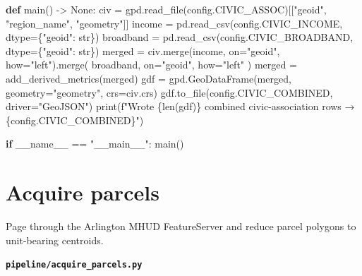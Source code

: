 \documentclass[
  letterpaper,
  DIV=11,
  numbers=noendperiod]{scrreprt}
\newenvironment{Shaded}{\begin{snugshade}}{\end{snugshade}}
\newcommand{\BuiltInTok}[1]{\textcolor[rgb]{0.00,0.23,0.31}{#1}}
\newcommand{\ControlFlowTok}[1]{\textcolor[rgb]{0.00,0.23,0.31}{\textbf{#1}}}
\newcommand{\KeywordTok}[1]{\textcolor[rgb]{0.00,0.23,0.31}{\textbf{#1}}}
\newcommand{\NormalTok}[1]{\textcolor[rgb]{0.00,0.23,0.31}{#1}}
\newcommand{\OperatorTok}[1]{\textcolor[rgb]{0.37,0.37,0.37}{#1}}
\newcommand{\SpecialCharTok}[1]{\textcolor[rgb]{0.37,0.37,0.37}{#1}}
\newcommand{\SpecialStringTok}[1]{\textcolor[rgb]{0.13,0.47,0.30}{#1}}
\newcommand{\StringTok}[1]{\textcolor[rgb]{0.13,0.47,0.30}{#1}}
\newcommand{\VariableTok}[1]{\textcolor[rgb]{0.07,0.07,0.07}{#1}}
\begin{document}
\begin{Shaded}
\begin{Highlighting}[]
\KeywordTok{def}\NormalTok{ main() }\OperatorTok{{-}\textgreater{}} \VariableTok{None}\NormalTok{:}
\NormalTok{    civ }\OperatorTok{=}\NormalTok{ gpd.read\_file(config.CIVIC\_ASSOC)[[}\StringTok{"geoid"}\NormalTok{, }\StringTok{"region\_name"}\NormalTok{, }\StringTok{"geometry"}\NormalTok{]]}
\NormalTok{    income }\OperatorTok{=}\NormalTok{ pd.read\_csv(config.CIVIC\_INCOME, dtype}\OperatorTok{=}\NormalTok{\{}\StringTok{"geoid"}\NormalTok{: }\BuiltInTok{str}\NormalTok{\})}
\NormalTok{    broadband }\OperatorTok{=}\NormalTok{ pd.read\_csv(config.CIVIC\_BROADBAND, dtype}\OperatorTok{=}\NormalTok{\{}\StringTok{"geoid"}\NormalTok{: }\BuiltInTok{str}\NormalTok{\})}
\NormalTok{    merged }\OperatorTok{=}\NormalTok{ civ.merge(income, on}\OperatorTok{=}\StringTok{"geoid"}\NormalTok{, how}\OperatorTok{=}\StringTok{"left"}\NormalTok{).merge(}
\NormalTok{        broadband, on}\OperatorTok{=}\StringTok{"geoid"}\NormalTok{, how}\OperatorTok{=}\StringTok{"left"}
\NormalTok{    )}
\NormalTok{    merged }\OperatorTok{=}\NormalTok{ add\_derived\_metrics(merged)}
\NormalTok{    gdf }\OperatorTok{=}\NormalTok{ gpd.GeoDataFrame(merged, geometry}\OperatorTok{=}\StringTok{"geometry"}\NormalTok{, crs}\OperatorTok{=}\NormalTok{civ.crs)}
\NormalTok{    gdf.to\_file(config.CIVIC\_COMBINED, driver}\OperatorTok{=}\StringTok{"GeoJSON"}\NormalTok{)}
    \BuiltInTok{print}\NormalTok{(}\SpecialStringTok{f"Wrote }\SpecialCharTok{\{}\BuiltInTok{len}\NormalTok{(gdf)}\SpecialCharTok{\}}\SpecialStringTok{ combined civic{-}association rows → }\SpecialCharTok{\{}\NormalTok{config}\SpecialCharTok{.}\NormalTok{CIVIC\_COMBINED}\SpecialCharTok{\}}\SpecialStringTok{"}\NormalTok{)}


\ControlFlowTok{if} \VariableTok{\_\_name\_\_} \OperatorTok{==} \StringTok{"\_\_main\_\_"}\NormalTok{:}
\NormalTok{    main()}
\end{Highlighting}
\end{Shaded}

\section{Acquire parcels}\label{acquire-parcels}

Page through the Arlington MHUD FeatureServer and reduce parcel polygons
to unit-bearing centroids.

\textbf{\texttt{pipeline/acquire\_parcels.py}}
\end{document}
